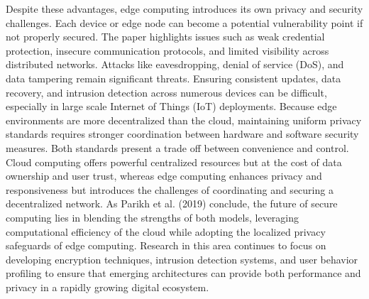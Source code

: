 \documentclass[conference]{IEEEtran}
\begin{document}
Despite these advantages, edge computing introduces its own privacy and security challenges. Each device or edge node can become a potential vulnerability point if not properly secured. The paper highlights issues such as weak credential protection, insecure communication protocols, and limited visibility across distributed networks. Attacks like eavesdropping, denial of service (DoS), and data tampering remain significant threats. Ensuring consistent updates, data recovery, and intrusion detection across numerous devices can be difficult, especially in large scale Internet of Things (IoT) deployments. Because edge environments are more decentralized than the cloud, maintaining uniform privacy standards requires stronger coordination between hardware and software security measures. 
Both standards present a trade off between convenience and control. Cloud computing offers powerful centralized resources but at the cost of data ownership and user trust, whereas edge computing enhances privacy and responsiveness but introduces the challenges of coordinating and securing a decentralized network. As Parikh et al. (2019) conclude, the future of secure computing lies in blending the strengths of both models, leveraging computational efficiency of the cloud while adopting the localized privacy safeguards of edge computing. Research in this area continues to focus on developing encryption techniques, intrusion detection systems, and user behavior profiling to ensure that emerging architectures can provide both performance and privacy in a rapidly growing digital ecosystem.
\end{document}
